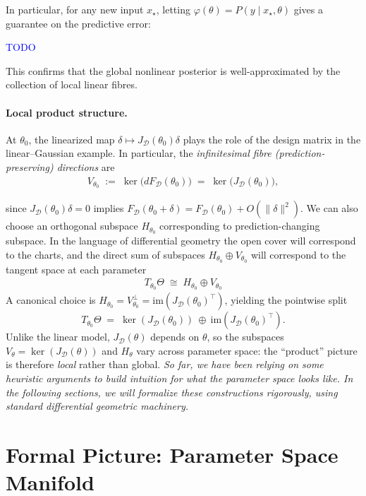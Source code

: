 In particular, for any new input $x_\star$,
letting $\varphi(\theta)=P(y \mid x_\star,\theta)$ gives a guarantee on the predictive error:

\textcolor{blue}{TODO}

This confirms that the global nonlinear posterior is well-approximated by the collection of local linear fibres.
\paragraph{Local product structure.}
At $\theta_0$, the linearized map $\delta\mapsto J_{\mathcal D}(\theta_0)\delta$ plays the role of the design matrix in the
linear--Gaussian example. In particular, the \emph{infinitesimal fibre (prediction-preserving) directions} are
\begin{align}
    V_{\theta_0}\;:=\;\ker\!\bigl(dF_{\mathcal D}(\theta_0)\bigr)\;=\;\ker\!\bigl(J_{\mathcal D}(\theta_0)\bigr),
\end{align}

since $J_{\mathcal D}(\theta_0)\delta=0$ implies $F_{\mathcal D}(\theta_0+\delta)=F_{\mathcal D}(\theta_0)+O(\|\delta\|^2)$.
We can also choose an orthogonal subspace $H_{\theta_0}$ corresponding to prediction-changing subspace. In the language of differential geometry the open cover will correspond to the charts, and the direct sum of subspaces $H_{\theta_0}\oplus V_{\theta_0}$ will correspond to the tangent space at each parameter
\begin{align}
    T_{\theta_0}\Theta \;\cong\; H_{\theta_0}\oplus V_{\theta_0}
\end{align}
A canonical choice is
$H_{\theta_0}=V_{\theta_0}^\perp=\mathrm{im}(J_{\mathcal D}(\theta_0)^\top)$, yielding the pointwise split
\[
T_{\theta_0}\Theta \;=\; \ker(J_{\mathcal D}(\theta_0))\ \oplus\ \mathrm{im}(J_{\mathcal D}(\theta_0)^\top).
\]
Unlike the linear model, $J_{\mathcal D}(\theta)$ depends on $\theta$, so the subspaces
$V_\theta=\ker(J_{\mathcal D}(\theta))$ and $H_\theta$ vary across parameter space: the ``product'' picture is therefore
\emph{local} rather than global. 
\emph{So far, we have been relying on some heuristic arguments to build intuition for what the parameter space looks like. In the following sections, we will formalize these constructions rigorously, using standard differential geometric machinery.}


\section{Formal Picture: Parameter Space Manifold}
\label{sec:parammanifold_formal}
